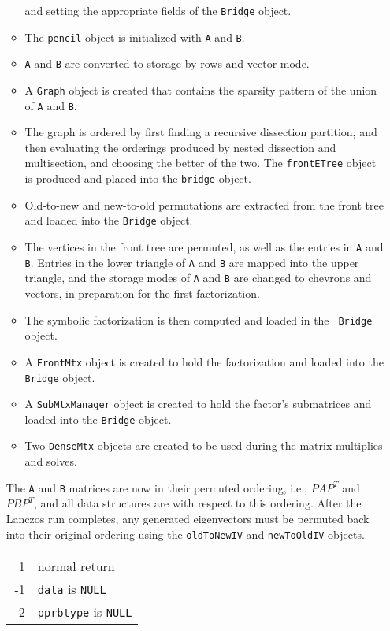 \begin{enumerate}
\begin{itemize}
and setting the appropriate fields of the {\tt Bridge} object.
\item
The {\tt pencil} object is initialized with {\tt A} and {\tt B}.
\item
{\tt A} and {\tt B} are converted to storage by rows and vector mode.
\item
A {\tt Graph} object is created that contains the sparsity pattern of
the union of {\tt A} and {\tt B}.
\item
The graph is ordered by first finding a recursive dissection partition,
and then evaluating the orderings produced by nested dissection and
multisection, and choosing the better of the two.
The {\tt frontETree} object is produced and placed into the {\tt bridge}
object.
\item
Old-to-new and new-to-old permutations are extracted from the front tree
and loaded into the {\tt Bridge} object.
\item
The vertices in the front tree are permuted, as well as the entries in 
{\tt A} and {\tt B}.
Entries in the lower triangle of {\tt A} and {\tt B} are mapped into the
upper triangle, and the storage modes of {\tt A} and {\tt B} are changed
to chevrons and vectors, in preparation for the first factorization.
\item
The symbolic factorization is then computed and loaded in the {\tt
Bridge} object.
\item
A {\tt FrontMtx} object is created to hold the factorization
and loaded into the {\tt Bridge} object.
\item
A {\tt SubMtxManager} object is created to hold the factor's
submatrices and loaded into the {\tt Bridge} object.
\item
Two {\tt DenseMtx} objects are created to be used during the matrix
multiplies and solves.
\end{itemize}
The {\tt A} and {\tt B} matrices are now in their permuted ordering,
i.e., $PAP^T$ and $PBP^T$, and all data structures are with respect to
this ordering. After the Lanczos run completes, any generated
eigenvectors must be permuted back into their original ordering using
the {\tt oldToNewIV} and {\tt newToOldIV} objects.
\par {}
\begin{center}
\begin{tabular}[t]{rl}
~1 & normal return \\
-1 & \texttt{data} is \texttt{NULL} \\
-2 & \texttt{pprbtype} is \texttt{NULL} \\

\end{tabular}
\end{center}
\end{enumerate}
